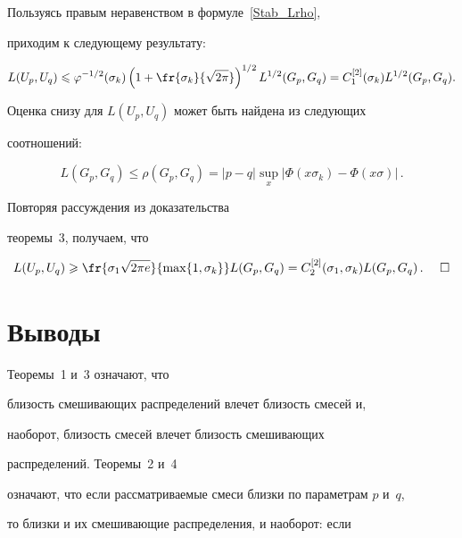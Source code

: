 Пользуясь правым неравенством в формуле~\eqref{Stab_Lrho},

приходим к следующему результату:

\begin{equation*}

L(U_p,U_q)\leqslant\varphi^{-1/2}(\sigma_k)\left(1+\fr{\sigma_k}

{\sqrt{2\pi}}\right)^{1/2}L^{1/2}(G_p,G_q)=

C_1^{[2]}(\sigma_k)L^{1/2}(G_p,G_q).

\end{equation*}



Оценка снизу для $L(U_p,U_q)$ может быть найдена из следующих

соотношений:

\begin{equation*}

L(G_p,G_q)\leqslant\rho(G_p,G_q)=|p-q|\sup\limits_x|

\Phi(x\sigma_k)-\Phi(x\sigma)|\,.

\end{equation*}



Повторяя рассуждения из доказательства

теоремы~3, получаем, что

\begin{equation*}

L(U_p,U_q)\geqslant\fr{\sigma_1\sqrt{2\pi e}}{\max\{1,\sigma_k\}}L(G_p,G_q)

=C_2^{[2]}(\sigma_1,\sigma_k)L(G_p,G_q)\,.~~~~\Box

\end{equation*}





\section{Выводы}

Теоремы~1 и~3 означают, что

близость смешивающих распределений влечет близость смесей и,

наоборот, близость смесей влечет близость смешивающих

распределений. Теоремы~2 и~4

означают, что если рассматриваемые смеси близки по параметрам $p$ и~$q$, 

то близки и их смешивающие распределения, и наоборот: если

